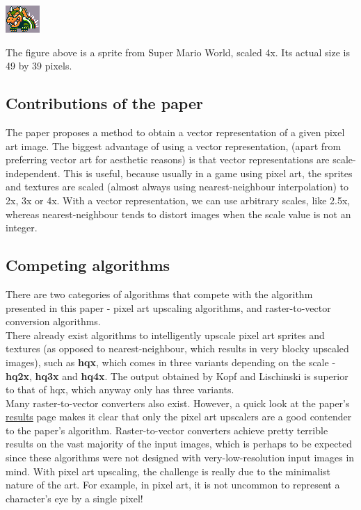 \documentclass[a4paper,9pt]{article}
\begin{document}
\centerline{\includegraphics[scale=4]{../../img/smw_bowser}}

The figure above is a sprite from Super Mario World, scaled 4x. Its actual size is 49 by 39 pixels.

\textcolor{myrust}{\subsection{Contributions of the paper}}

The paper proposes a method to obtain a vector representation of a given pixel art image. The biggest advantage of using a vector representation, (apart from preferring vector art for aesthetic reasons) is that vector representations are scale-independent. This is useful, because usually in a game using pixel art, the sprites and textures are scaled (almost always using nearest-neighbour interpolation) to 2x, 3x or 4x. With a vector representation, we can use arbitrary scales, like 2.5x, whereas nearest-neighbour tends to distort images when the scale value is not an integer.

\textcolor{myrust}{\subsection{Competing algorithms}}

There are two categories of algorithms that compete with the algorithm presented in this paper - pixel art upscaling algorithms, and raster-to-vector conversion algorithms.\\

There already exist algorithms to intelligently upscale pixel art sprites and textures (as opposed to nearest-neighbour, which results in very blocky upscaled images), such as \textbf{hqx}, which comes in three variants depending on the scale - \textbf{hq2x}, \textbf{hq3x} and \textbf{hq4x}. The output obtained by Kopf and Lischinski is superior to that of hqx, which anyway only has three variants.\\

Many raster-to-vector converters also exist. However, a quick look at the paper's \href{http://research.microsoft.com/en-us/um/people/kopf/pixelart/supplementary/multi_comparison.html}{results} page makes it clear that only the pixel art upscalers are a good contender to the paper's algorithm. Raster-to-vector converters achieve pretty terrible results on the vast majority of the input images, which is perhaps to be expected since these algorithms were not designed with very-low-resolution input images in mind. With pixel art upscaling, the challenge is really due to the minimalist nature of the art. For example, in pixel art, it is not uncommon to represent a character's eye by a single pixel!
\end{document}
